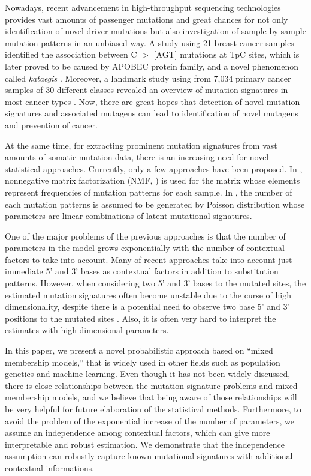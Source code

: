 Nowadays, recent advancement in high-throughput sequencing technologies provides vast amounts of passenger mutations
and great chances for not only identification of novel driver mutations but also investigation of sample-by-sample mutation patterns in an unbiased way. 
A study using 21 breast cancer samples identified the association between C $>$ [AGT] mutations at TpC sites, 
which is later proved to be caused by APOBEC protein family, and a novel phenomenon called {\it kataegis} \cite{pmid22608084}. 
Moreover, a landmark study using from 7,034 primary cancer samples of 30 different classes revealed an overview of mutation signatures in most cancer types \cite{pmid23945592}. 
Now, there are great hopes that detection of novel mutation signatures and associated mutagens can lead to identification of novel mutagens and prevention of cancer.


At the same time, for extracting prominent mutation signatures from vast amounts of somatic mutation data,
there is an increasing need for novel statistical approaches.
Currently, only a few approaches have been proposed. 
In \cite{pmid23318258}, nonnegative matrix factorization (NMF, \cite{pmid10548103}) is used for the matrix whose elements represent frequencies of mutation patterns for each sample. 
In \cite{pmid23628380}, the number of each mutation patterns is assumed to be generated by Poisson distribution whose parameters are linear combinations of latent mutational signatures. 


One of the major problems of the previous approaches is that 
the number of parameters in the model grows exponentially 
with the number of contextual factors to take into account.
Many of recent approaches take into account just immediate 5' and 3' bases as contextual factors in addition to substitution patterns.
However, when considering two 5' and 3' bases to the mutated sites,
the estimated mutation signatures often become unstable due to the curse of high dimensionality, 
despite there is a potential need to observe two base 5' and 3' positions to the mutated sites \cite{pmid9683596}.
Also, it is often very hard to interpret the estimates with high-dimensional parameters.


In this paper, we present a novel probabilistic approach based on ``mixed membership models,'' that is widely used in other fields such as population genetics and machine learning.
Even though it has not been widely discussed, there is close relationships between the mutation signature problems and mixed membership models,
and we believe that being aware of those relationships will be very helpful for future elaboration of the statistical methods.
Furthermore, to avoid the problem of the exponential increase of the number of parameters,
we assume an independence among contextual factors, which can give more interpretable and robust estimation.
We demonstrate that the independence assumption can robustly capture known mutational signatures with additional contextual informations.

